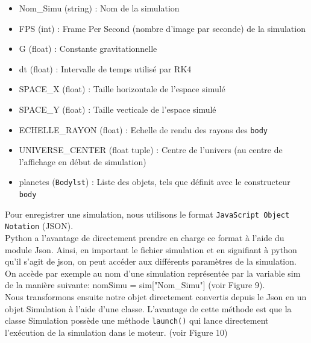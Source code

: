 \documentclass[a4paper, 12pt]{article}
\begin{document}
    \begin{itemize}
        \item Nom\_Simu (string) : Nom de la simulation
        \item FPS (int) : Frame Per Second (nombre d'image par seconde) de la simulation
        \item G (float) : Constante gravitationnelle
        \item dt (float) : Intervalle de temps utilisé par RK4
        \item SPACE\_X (float) : Taille horizontale de l'espace simulé
        \item SPACE\_Y (float) : Taille vecticale de l'espace simulé
        \item ECHELLE\_RAYON (float) : Echelle de rendu des rayons des \texttt{body}
        \item UNIVERSE\_CENTER (float tuple) : Centre de l'univers (au centre de l'affichage en début de simulation)
        \item planetes (\texttt{Bodylst}) : Liste des objets, tels que définit avec le constructeur \texttt{body}\\ 
    \end{itemize} 

Pour enregistrer une simulation, nous utilisons le format \texttt{JavaScript Object Notation} (JSON).\\ 

Python a l'avantage de directement prendre en charge ce format à l'aide du module Json. Ainsi, en important le fichier simulation et en signifiant à python qu'il s'agit de json, on peut accéder aux différents paramètres de la simulation. \\

On accède par exemple au nom d'une simulation représentée par la variable sim de la manière suivante: nomSimu = sim["Nom\_Simu"] (voir Figure 9). \\

Nous transformons ensuite notre objet directement convertis depuis le Json en un objet Simulation à l'aide d'une classe. L'avantage de cette méthode est que la classe Simulation possède une méthode \texttt{launch()} qui lance directement l'exécution de la simulation dans le moteur. (voir Figure 10)
\end{document}
